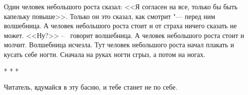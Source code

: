 \begin{flushleft}
	Один человек небольшого роста сказал: <<Я согласен на все, только бы быть
	капельку повыше>>. Только он это сказал, как смотрит "--- перед ним
	волшебница. А человек небольшого роста стоит и от страха ничего сказать не
	может. <<Ну?>> --~ говорит волшебница. А человек небольшого роста стоит и
	молчит. Волшебница исчезла.	Тут человек небольшого роста начал плакать и 
	кусать себе ногти. Сначала на руках ногти сгрыз, а потом на ногах.

	\begin{center}
		*  *  *
	\end{center}
	
	Читатель, вдумайся в эту басню, и тебе станет не по себе.
\end{flushleft}